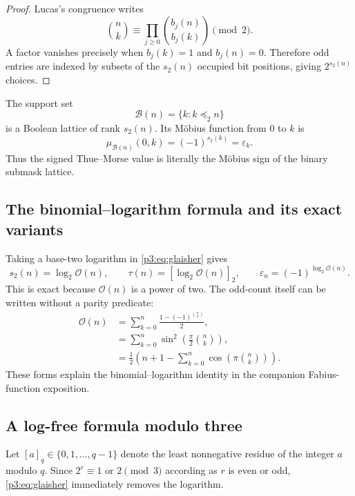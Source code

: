 \documentclass[11pt,oneside]{article}
\theoremstyle{definition}
\theoremstyle{remark}
\newcommand{\bitsum}{s_2}
\newcommand{\eps}{\varepsilon}
\newcommand{\res}[2]{\left[#1\right]_{#2}}
\newcommand{\submask}{\preccurlyeq_2}
\begin{document}
\begin{proof}
Lucas's congruence writes
\[
 \binom nk\equiv\prod_{j\ge0}\binom{b_j(n)}{b_j(k)}\pmod2.
\]
A factor vanishes precisely when $b_j(k)=1$ and $b_j(n)=0$.  Therefore odd
entries are indexed by subsets of the $\bitsum(n)$ occupied bit positions,
giving $2^{\bitsum(n)}$ choices.
\end{proof}

The support set
\begin{equation}\label{p3:eq:pascal-support}
 \mathcal B(n)=\{k:k\submask n\}
\end{equation}
is a Boolean lattice of rank $\bitsum(n)$.  Its Möbius function from $0$ to
$k$ is
\begin{equation}\label{p3:eq:boolean-mobius}
 \mu_{\mathcal B(n)}(0,k)=(-1)^{\bitsum(k)}=\eps_k.
\end{equation}
Thus the signed Thue--Morse value is literally the Möbius sign of the binary
submask lattice.

\subsection{The binomial--logarithm formula and its exact variants}

Taking a base-two logarithm in \cref{p3:eq:glaisher} gives
\begin{equation}\label{p3:eq:binomial-log}
 \bitsum(n)=\log_2\mathcal O(n),
 \qquad
 \tau(n)=\res{\log_2\mathcal O(n)}{2},
 \qquad
 \eps_n=(-1)^{\log_2\mathcal O(n)}.
\end{equation}
This is exact because $\mathcal O(n)$ is a power of two.  The odd-count itself
can be written without a parity predicate:
\begin{align}
 \mathcal O(n)
 &=\sum_{k=0}^n \frac{1-(-1)^{\binom nk}}2,\label{p3:eq:odd-count-sign}\\
 &=\sum_{k=0}^n\sin^2\!\left(\frac\pi2\binom nk\right),\label{p3:eq:odd-count-trig}\\
 &=\frac12\left(n+1-\sum_{k=0}^n\cos\!\left(\pi\binom nk\right)\right).
 \label{p3:eq:odd-count-cos}
\end{align}
These forms explain the binomial--logarithm identity in the companion
Fabius-function exposition.

\subsection{A log-free formula modulo three}

Let $[a]_q\in\{0,1,\ldots,q-1\}$ denote the least nonnegative residue of the
integer $a$ modulo $q$.  Since $2^r\equiv1$ or $2\pmod3$ according as $r$ is
even or odd, \cref{p3:eq:glaisher} immediately removes the logarithm.
\end{document}
